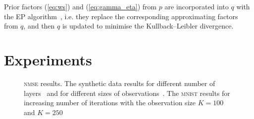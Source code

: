 \documentclass{article}
\begin{document}
  Prior factors (\ref{eq:ws}) and (\ref{eq:gamma_eta}) from $p$ are incorporated into $q$ with the EP algorithm~\cite{hernandez2015probabilistic}, i.e. they replace the corresponding approximating factors from $q$, and then $q$ is updated to minimise the Kullback--Leibler divergence.
  
  \section{Experiments}
  \label{sec:experiments}

   \begin{figure}[!t]
  \centering
  \hfil
  \hfil
  \hfil
  \caption{\textsc{nmse} results. The synthetic data results for different number of layers~\protect{} and for different sizes of observations~\protect{}. The \textsc{mnist} results for increasing number of iterations with the observation size $K = 100$~\protect{} and $K = 250$~\protect{}}
  \label{fig:number_of_layers_synthetic}
  \end{figure}  
  
\end{document}
